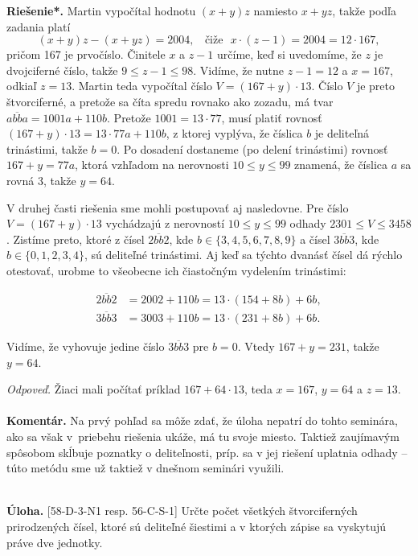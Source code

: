\documentclass[11pt,a4paper,oneside,final]{book}
\newcommand{\kom}{\textbf{Komentár.} }
\newcommand{\ul}{\textbf{Úloha.} }
\newcommand{\rieh}{\textbf{Riešenie*.} }
\begin{document}
\rieh Martin vypočítal hodnotu $(x + y)z$ namiesto $x + yz$, takže podľa zadania platí
$$(x + y)z - (x + yz) = 2 004, \ \ \ \ \text{čiže} \ \ \  x \cdot (z - 1) = 2 004 = 12 \cdot 167,$$
pričom 167 je prvočíslo. Činitele $x$ a $z -1$ určíme, keď si uvedomíme, že $z$ je dvojciferné číslo, takže $9 \leq z - 1 \leq 98$. Vidíme, že nutne $z - 1 = 12$ a  $x = 167$, odkiaľ $z = 13$. Martin teda vypočítal číslo $V = (167+y)\cdot 13$. Číslo $V$ je preto štvorciferné, a pretože sa číta spredu rovnako ako zozadu, má tvar $\overline{abba} = 1 001a + 110b$. Pretože $1 001 = 13 \cdot 77$, musí platiť rovnosť $(167 + y) \cdot 13 = 13 \cdot 77a + 110b$, z ktorej vyplýva, že číslica $b$ je deliteľná trinástimi, takže $b = 0$. Po dosadení dostaneme (po delení trinástimi) rovnosť $167 + y = 77a$, ktorá vzhľadom na nerovnosti $10 \leq  y \leq 99$ znamená, že číslica $a$ sa rovná 3, takže $y = 64$.

V druhej časti riešenia sme mohli postupovať aj nasledovne. Pre číslo $V = (167 + y) \cdot 13$ vychádzajú z nerovností $10 \leq y \leq 99$ odhady $2301 \leq V \leq 3 458$. Zistíme
preto, ktoré z čísel $\overline{2bb2}$, kde $b \in \{3, 4, 5, 6, 7, 8, 9\}$ a čísel $\overline{3bb3}$, kde $b \in \{0, 1, 2, 3, 4\}$, sú deliteľné trinástimi. Aj keď sa týchto dvanásť čísel dá rýchlo otestovať, urobme to všeobecne ich čiastočným vydelením trinástimi:
\vspace{-30pt}
\begin{center}
\begin{align*}
 \overline{2bb2} &= 2 002 + 110b = 13 \cdot (154 + 8b) + 6b,\\
\overline{3bb3} &= 3 003 + 110b = 13 \cdot (231 + 8b) + 6b.
\end{align*}
\end{center}
Vidíme, že vyhovuje jedine číslo $\overline{3bb3}$ pre $b = 0$. Vtedy $167 + y = 231$, takže $y = 64$.

\textit{Odpoveď.} Žiaci mali počítať príklad $167 + 64 \cdot 13$, teda $x = 167$, $y = 64$ a $z = 13$.\\
\\
\kom Na prvý pohľad sa môže zdať, že úloha nepatrí do tohto seminára, ako sa však v~priebehu riešenia ukáže, má tu svoje miesto. Taktiež zaujímavým spôsobom skĺbuje poznatky o deliteľnosti, príp. sa v jej riešení uplatnia odhady -- túto metódu sme už taktiež v dnešnom seminári využili.\\
\\
\begin{tcolorbox}[breakable,notitle,boxrule=0pt,colback=light-gray,colframe=light-gray]\ul [58-D-3-N1 resp. 56-C-S-1] Určte počet všetkých štvorciferných prirodzených čísel, ktoré sú deliteľné šiestimi a v ktorých zápise sa vyskytujú práve dve jednotky.

\end{tcolorbox}
\end{document}
